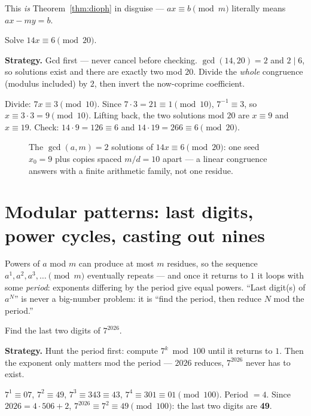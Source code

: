 This \emph{is} Theorem~\ref{thm:dioph} in disguise --- $ax \equiv b
\pmod m$ literally means $ax - my = b$.

\begin{example}\label{ex:lincong}
Solve $14x \equiv 6 \pmod{20}$.
\par\smallskip
\textbf{Strategy.} Gcd first --- never cancel before checking.
$\gcd(14,20)=2$ and $2 \mid 6$, so solutions exist and there are exactly
two mod $20$. Divide the \emph{whole} congruence (modulus included) by $2$,
then invert the now-coprime coefficient.
\par\smallskip
\begin{solution}
Divide: $7x \equiv 3 \pmod{10}$. Since $7 \cdot 3 = 21 \equiv 1
\pmod{10}$, $7^{-1} \equiv 3$, so $x \equiv 3 \cdot 3 = 9 \pmod{10}$.
Lifting back, the two solutions mod $20$ are $x \equiv 9$ and $x \equiv
19$. Check: $14 \cdot 9 = 126 \equiv 6$ and $14 \cdot 19 = 266 \equiv 6
\pmod{20}$.
\end{solution}
\end{example}

\begin{figure}[ht]\centering

\caption{The $\gcd(a,m) = 2$ solutions of $14x \equiv 6 \pmod{20}$: one
seed $x_0 = 9$ plus copies spaced $m/d = 10$ apart --- a linear congruence
answers with a finite arithmetic family, not one residue.}
\label{fig:linline}
\end{figure}

\section{Modular patterns: last digits, power cycles, casting out
nines}\label{sec:patterns}

Powers of $a$ mod $m$ can produce at most $m$ residues, so the sequence
$a^1, a^2, a^3, \dots \pmod m$ eventually repeats --- and once it returns to
$1$ it loops with some \emph{period}: exponents differing by the period give equal powers.
``Last digit(s) of $a^N$'' is never a big-number problem: it is ``find the
period, then reduce $N$ mod the period.''

\begin{example}\label{ex:powers}
Find the last two digits of $7^{2026}$.
\par\smallskip
\textbf{Strategy.} Hunt the period first: compute $7^k \bmod 100$ until it
returns to $1$. Then the exponent only matters mod the period --- $2026$
reduces, $7^{2026}$ never has to exist.
\par\smallskip
\begin{solution}
$7^1 \equiv 07$, $7^2 \equiv 49$, $7^3 \equiv 343 \equiv 43$,
$7^4 \equiv 301 \equiv 01 \pmod{100}$. Period $= 4$. Since
$2026 = 4\cdot506 + 2$, $7^{2026} \equiv 7^2 \equiv 49 \pmod{100}$: the
last two digits are \textbf{49}.
\end{solution}
\end{example}

